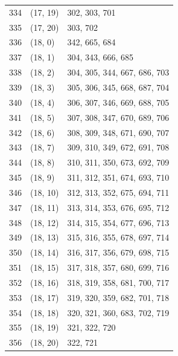 \documentclass{article}
\begin{document}
\begin{longtable}{lll}
  334 & (17, 19) & 302, 303, 701 \\
  335 & (17, 20) & 303, 702 \\
  336 & (18, 0) & 342, 665, 684 \\
  337 & (18, 1) & 304, 343, 666, 685 \\
  338 & (18, 2) & 304, 305, 344, 667, 686, 703 \\
  339 & (18, 3) & 305, 306, 345, 668, 687, 704 \\
  340 & (18, 4) & 306, 307, 346, 669, 688, 705 \\
  341 & (18, 5) & 307, 308, 347, 670, 689, 706 \\
  342 & (18, 6) & 308, 309, 348, 671, 690, 707 \\
  343 & (18, 7) & 309, 310, 349, 672, 691, 708 \\
  344 & (18, 8) & 310, 311, 350, 673, 692, 709 \\
  345 & (18, 9) & 311, 312, 351, 674, 693, 710 \\
  346 & (18, 10) & 312, 313, 352, 675, 694, 711 \\
  347 & (18, 11) & 313, 314, 353, 676, 695, 712 \\
  348 & (18, 12) & 314, 315, 354, 677, 696, 713 \\
  349 & (18, 13) & 315, 316, 355, 678, 697, 714 \\
  350 & (18, 14) & 316, 317, 356, 679, 698, 715 \\
  351 & (18, 15) & 317, 318, 357, 680, 699, 716 \\
  352 & (18, 16) & 318, 319, 358, 681, 700, 717 \\
  353 & (18, 17) & 319, 320, 359, 682, 701, 718 \\
  354 & (18, 18) & 320, 321, 360, 683, 702, 719 \\
  355 & (18, 19) & 321, 322, 720 \\
  356 & (18, 20) & 322, 721 \\
\end{longtable}
\end{document}
